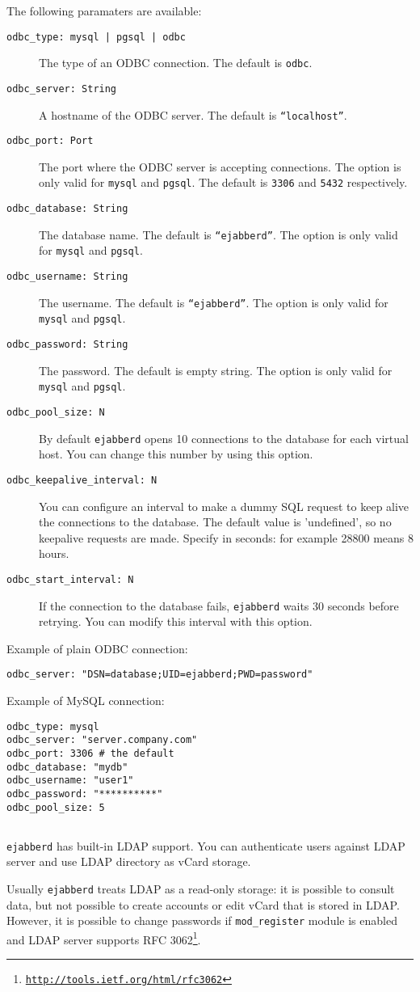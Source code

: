\documentclass[a4paper,10pt]{book}
\newcommand{\ind}[1]{\begin{latexonly}\index{#1}\end{latexonly}}
\newcommand{\makesubsection}[2]{ \aname{#1}{} \subsection{\ahrefloc{#1}{#2}} \label{#1} }
\newcommand{\bracehack}{\def\{{\char"7B}\def\}{\char"7D}}
\newcommand{\titem}[1]{\item[\bracehack\texttt{#1}]}
\newcommand{\term}[1]{\texttt{#1}}
\newcommand{\ejabberd}{\texttt{ejabberd}}
\newcommand{\module}[1]{\texttt{#1}}
\gdef\footahref#1#2{#2\footnote{\href{#1}{\texttt{#1}}}}
\begin{document}
The following paramaters are available:
\begin{description}
  \titem{odbc\_type: mysql | pgsql | odbc} The type of an ODBC connection.
  The default is \term{odbc}.
  \titem{odbc\_server: String} A hostname of the ODBC server. The default is
  \term{``localhost''}.
  \titem{odbc\_port: Port} The port where the ODBC server is accepting connections.
  The option is only valid for \term{mysql} and \term{pgsql}. The default is
  \term{3306} and \term{5432} respectively.
  \titem{odbc\_database: String} The database name. The default is \term{``ejabberd''}.
  The option is only valid for \term{mysql} and \term{pgsql}.
  \titem{odbc\_username: String} The username. The default is \term{``ejabberd''}.
  The option is only valid for \term{mysql} and \term{pgsql}. 
  \titem{odbc\_password: String} The password. The default is empty string.
  The option is only valid for \term{mysql} and \term{pgsql}.
  \titem{odbc\_pool\_size: N} By default \ejabberd{} opens 10 connections to
  the database for each virtual host. You can change this number by using this option.
  \titem{odbc\_keepalive\_interval: N} You can configure an interval to
  make a dummy SQL request to keep alive the connections to the database.
  The default value is 'undefined', so no keepalive requests are made.
  Specify in seconds: for example 28800 means 8 hours.
  \titem{odbc\_start\_interval: N} If the connection to the database fails,
  \ejabberd{} waits 30 seconds before retrying.
  You can modify this interval with this option.
\end{description}

Example of plain ODBC connection:
\begin{verbatim}
odbc_server: "DSN=database;UID=ejabberd;PWD=password"
\end{verbatim}

Example of MySQL connection:
\begin{verbatim}
odbc_type: mysql
odbc_server: "server.company.com"
odbc_port: 3306 # the default
odbc_database: "mydb"
odbc_username: "user1"
odbc_password: "**********"
odbc_pool_size: 5
\end{verbatim}

\makesubsection{ldap}{LDAP}
\ind{databases!LDAP}

\ejabberd{} has built-in LDAP support. You can authenticate users against LDAP
server and use LDAP directory as vCard storage.

Usually \ejabberd{} treats LDAP as a read-only storage:
it is possible to consult data, but not possible to
create accounts or edit vCard that is stored in LDAP.
However, it is possible to change passwords if \module{mod\_register} module is enabled
and LDAP server supports
\footahref{http://tools.ietf.org/html/rfc3062}{RFC 3062}.
\end{document}
